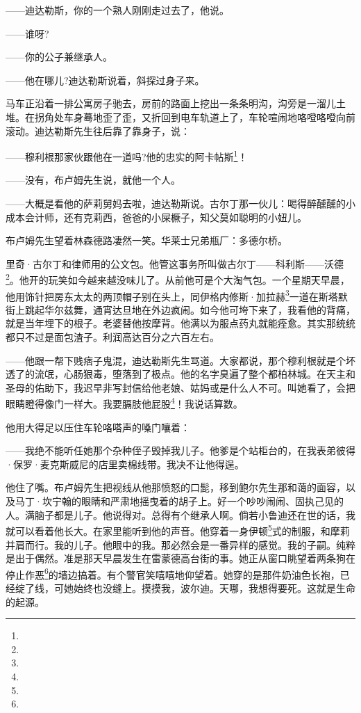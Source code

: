 \par ——迪达勒斯，你的一个熟人刚刚走过去了，他说。
\par ——谁呀?
\par ——你的公子兼继承人。
\par ——他在哪儿?迪达勒斯说着，斜探过身子来。
\par 马车正沿着一排公寓房子驰去，房前的路面上挖出一条条明沟，沟旁是一溜儿土堆。在拐角处车身蓦地歪了歪，又折回到电车轨道上了，车轮喧闹地咯噔咯噔向前滚动。迪达勒斯先生往后靠了靠身子，说：
\par ——穆利根那家伙跟他在一道吗?他的忠实的阿卡帖斯\footnote{}！
\par ——没有，布卢姆先生说，就他一个人。
\par ——大概是看他的萨莉舅妈去啦，迪达勒斯说。古尔丁那一伙儿：喝得醉醺醺的小成本会计师，还有克莉西，爸爸的小屎橛子，知父莫如聪明的小妞儿。
\par 布卢姆先生望着林森德路凄然一笑。华莱士兄弟瓶厂：多德尔桥。
\par 里奇·古尔丁和律师用的公文包。他管这事务所叫做古尔丁——科利斯——沃德\footnote{}。他开的玩笑如今越来越没味儿了。从前他可是个大淘气包。一个星期天早晨，他用饰针把房东太太的两顶帽子别在头上，同伊格内修斯·加拉赫\footnote{}一道在斯塔默街上跳起华尔兹舞，通宵达旦地在外边疯闹。如今他可垮下来了，我看他的背痛，就是当年埋下的根子。老婆替他按摩背。他满以为服点药丸就能痊愈。其实那统统都只不过是面包渣子。利润高达百分之六百左右。
\par ——他跟一帮下贱痞子鬼混，迪达勒斯先生骂道。大家都说，那个穆利根就是个坏透了的流氓，心肠狠毒，堕落到了极点。他的名字臭遍了整个都柏林城。在天主和圣母的佑助下，我迟早非写封信给他老娘、姑妈或是什么人不可。叫她看了，会把眼睛瞪得像门一样大。我要膈肢他屁股\footnote{}！我说话算数。
\par 他用大得足以压住车轮咯嗒声的嗓门嚷着：
\par ——我绝不能听任她那个杂种侄子毁掉我儿子。他爹是个站柜台的，在我表弟彼得·保罗·麦克斯威尼的店里卖棉线带。我决不让他得逞。
\par 他住了嘴。布卢姆先生把视线从他那愤怒的口髭，移到鲍尔先生那和蔼的面容，以及马丁·坎宁翰的眼睛和严肃地摇曳着的胡子上。好一个吵吵闹闹、固执己见的人。满脑子都是儿子。他说得对。总得有个继承人啊。倘若小鲁迪还在世的话，我就可以看着他长大。在家里能听到他的声音。他穿着一身伊顿\footnote{}式的制服，和摩莉并肩而行。我的儿子。他眼中的我。那必然会是一番异样的感觉。我的子嗣。纯粹是出于偶然。准是那天早晨发生在雷蒙德高台街的事。她正从窗口眺望着两条狗在停止作恶\footnote{}的墙边搞着。有个警官笑嘻嘻地仰望着。她穿的是那件奶油色长袍，已经绽了线，可她始终也没缝上。摸摸我，波尔迪。天哪，我想得要死。这就是生命的起源。
